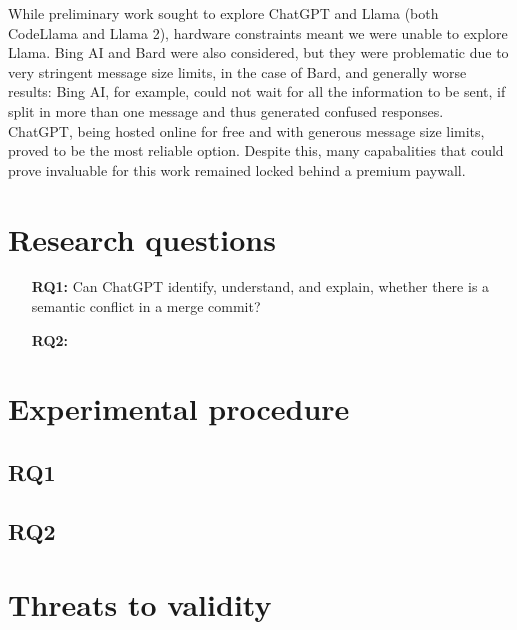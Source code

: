 While preliminary work sought to explore ChatGPT and Llama (both CodeLlama and Llama 2), hardware constraints meant we were unable to explore Llama. Bing AI and Bard were also considered, but they were problematic due to very stringent message size limits, in the case of Bard, and generally worse results: Bing AI, for example, could not wait for all the information to be sent, if split in more than one message and thus generated confused responses. ChatGPT, being hosted online for free and with generous message size limits, proved to be the most reliable option. Despite this, many capabalities that could prove invaluable for this work remained locked behind a premium paywall.


\section{Research questions}

\begin{itemize}
  \item[\textbf{RQ1:}] Can ChatGPT identify, understand, and explain, whether
  there is a semantic conflict in a merge commit?

  \item[\textbf{RQ2:}] 
\end{itemize}

\section{Experimental procedure}

\subsection{RQ1}


\subsection{RQ2}



\section{Threats to validity}


